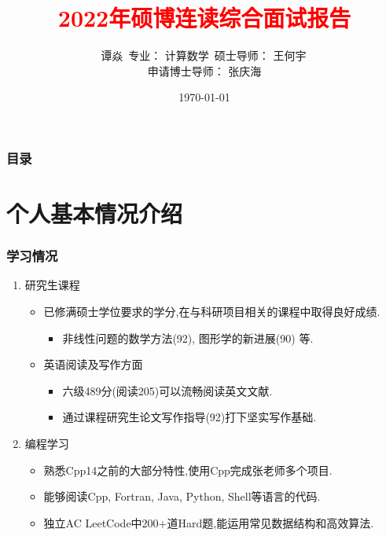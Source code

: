 \documentclass[UTF8]{ctexbeamer}	%
\title{\textcolor{red}{2022年硕博连读综合面试报告}}
\author{谭焱\, \newline   \newline \small{专业： 计算数学}\, 
\newline \newline
 \small{硕士导师： 王何宇\, \\
 申请博士导师： 张庆海}}
\institute{浙江大学数学科学学院}
\date{\today}
\theoremstyle{plain}
\theoremstyle{definition}
\newtheorem{emt}{}[section]
\theoremstyle{remark}
\numberwithin{equation}{section}
\begin{document}

\begin{frame}
\titlepage
\end{frame}


\begin{frame}
    \frametitle{目录}
    \tableofcontents
  \end{frame}

\section{个人基本情况介绍}


        


\begin{frame}[fragile]
    \frametitle{学习情况}
\begin{enumerate}
    \item 研究生课程
    \begin{itemize}
        \item 已修满硕士学位要求的学分,在与科研项目相关的课程中取得良好成绩.
        \begin{itemize}
            \item 非线性问题的数学方法(92), 图形学的新进展(90) 等.
        \end{itemize}
        \item 英语阅读及写作方面
        \begin{itemize}
            \item 六级489分(阅读205)可以流畅阅读英文文献.
            \item 通过课程研究生论文写作指导(92)打下坚实写作基础.
        \end{itemize}
    \end{itemize}
    \item 编程学习
    \begin{itemize}
        \item 熟悉Cpp14之前的大部分特性,使用Cpp完成张老师多个项目.
        \item 能够阅读Cpp, Fortran, Java, Python, Shell等语言的代码.
        \item 独立AC LeetCode中200+道Hard题,能运用常见数据结构和高效算法.
    \end{itemize}
\end{enumerate}
\end{frame}
\end{document}
